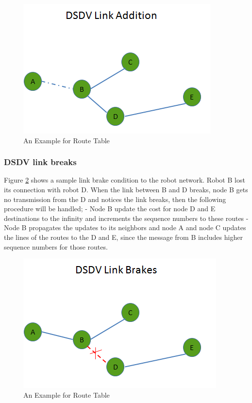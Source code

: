 \begin{figure}[H]
\caption{An Example for Route Table} \label{linkk_addition}
\centering
\includegraphics[scale = 0.65]{link_add}
\end{figure}	
		
\subsubsection{DSDV link breaks}

Figure \ref{linkk_brake} shows a sample link brake condition to the robot network. Robot B lost its connection with robot D. When the link between B and D breaks, node B gets no transmission from the D and notices the link breaks, then the following procedure will be handled; \newline
	- Node B update the cost for node D and E destinations to the infinity and increments the sequence numbers to these routes \newline
	- Node B propagates the updates to its neighbors and node A and node C updates the lines of the routes to the D and E, since the message from B includes higher sequence numbers for those routes.
		
\begin{figure}[H]
\caption{An Example for Route Table} \label{linkk_brake}
\centering
\includegraphics[scale = 0.65]{link_break}
\end{figure}
	
